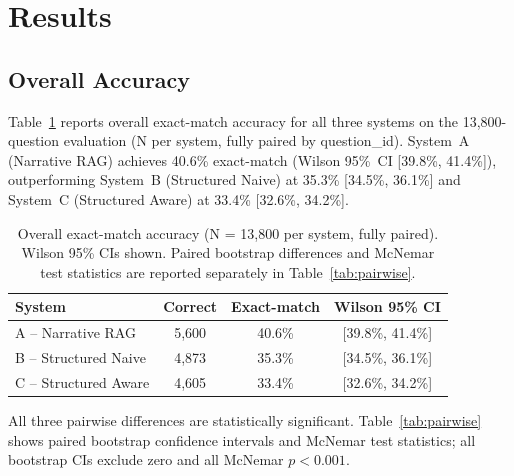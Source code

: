 
\section{Results}
\label{sec:results}

\subsection{Overall Accuracy}
\label{sec:results:overall}

Table~\ref{tab:main_results} reports overall exact-match accuracy for all three systems
on the 13,800-question evaluation (N per system, fully paired by question\_id).
System~A (Narrative RAG) achieves 40.6\% exact-match (Wilson 95\%~CI [39.8\%, 41.4\%]),
outperforming System~B (Structured Naive) at 35.3\% [34.5\%, 36.1\%] and System~C
(Structured Aware) at 33.4\% [32.6\%, 34.2\%].

\begin{table}[!htbp]
\centering
\caption{Overall exact-match accuracy (N = 13,800 per system, fully paired).
Wilson 95\% CIs shown. Paired bootstrap differences and McNemar test statistics
are reported separately in Table~\ref{tab:pairwise}.}
\label{tab:main_results}
\begin{tabular}{lccc}
\toprule
System & Correct & Exact-match & Wilson 95\% CI \\
\midrule
A -- Narrative RAG & 5,600 & 40.6\% & [39.8\%, 41.4\%] \\
B -- Structured Naive & 4,873 & 35.3\% & [34.5\%, 36.1\%] \\
C -- Structured Aware & 4,605 & 33.4\% & [32.6\%, 34.2\%] \\
\bottomrule
\end{tabular}
\end{table}

All three pairwise differences are statistically significant.
Table~\ref{tab:pairwise} shows paired bootstrap confidence intervals and McNemar
test statistics; all bootstrap CIs exclude zero and all McNemar $p < 0.001$.

